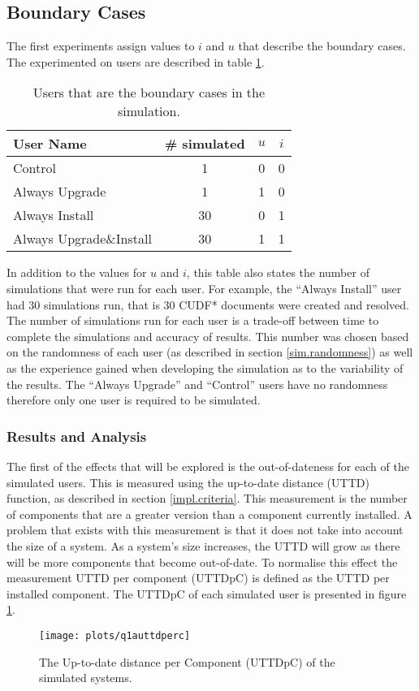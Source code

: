 \subsection{Boundary Cases}
The first experiments assign values to $i$ and $u$ that describe the boundary cases.
The experimented on users are described in table \ref{exp.tblextremeusers}.
\begin{table}[h!]
\centering
\begin{tabular}{|l | c | c | c |}
\hline
User Name 				 	& \# simulated 	& $u$ 		& $i$ 			\\ \hline
Control						& 1 			& 0			& 0				\\
Always Upgrade				& 1 			& 1			& 0				 \\
Always Install 				& 30 			& 0			& 1				 \\
Always Upgrade\&Install 	& 30 			& 1			& 1				\\ \hline
\end{tabular}
\caption{Users that are the boundary cases in the simulation.}
\label{exp.tblextremeusers}
\end{table}
In addition to the values for $u$ and $i$, this table also states the number of simulations that were run for each user.
For example, the ``Always Install'' user had 30 simulations run, that is 30 CUDF* documents were created and resolved.
The number of simulations run for each user is a trade-off between time to complete the simulations and accuracy of results.
This number was chosen based on the randomness of each user (as described in section \ref{sim.randomness}) 
as well as the experience gained when developing the simulation as to the variability of the results.
The ``Always Upgrade'' and ``Control'' users have no randomness therefore only one user is required to be simulated.

\subsubsection{Results and Analysis}
The first of the effects that will be explored is the out-of-dateness for each of the simulated users.
This is measured using the up-to-date distance (UTTD) function, as described in section \ref{impl.criteria}.
This measurement is the number of components that are a greater version than a component currently installed.
A problem that exists with this measurement is that it does not take into account the size of a system.
As a system's size increases, the UTTD will grow as there will be more components that become out-of-date.
To normalise this effect the measurement UTTD per component (UTTDpC) is defined as the UTTD per installed component.
The UTTDpC of each simulated user is presented in figure \ref{exp.q1auttdpc}.
\begin{figure}[htp]
\begin{center}
  \texttt{[image: plots/q1auttdperc]}
  \caption{The Up-to-date distance per Component (UTTDpC) of the simulated systems.}
  \label{exp.q1auttdpc}
\end{center}
\end{figure}

